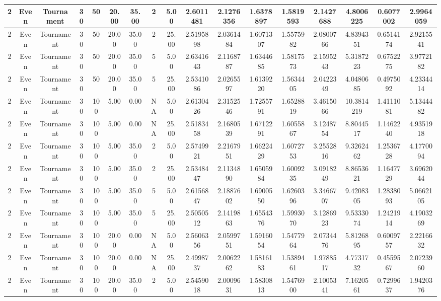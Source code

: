 \documentclass[a4paper]{article}
\begin{document}
\begin{center}
\begin{tabular}{ | c | c | c | c | c | c | c | c | c | c | c | c | c | c | c | c | c | }
		\hline
		2	&	Even	&	Tournament	&	30	&	50	&	20.00	&	35.00	&	2	&	5.00	&	2.6011481	&	2.1276356	&	1.6378897	&	1.5819593	&	2.1427688	&	4.8006225	&	0.6077002	&	2.9964059 \\
		\hline
		2	&	Even	&	Tournament	&	30	&	50	&	20.00	&	35.00	&	2	&	25.00	&	2.5195898	&	2.0361484	&	1.6071307	&	1.5575982	&	2.0800766	&	4.8394351	&	0.6514174	&	2.9215541 \\
		\hline
		2	&	Even	&	Tournament	&	30	&	50	&	20.00	&	35.00	&	5	&	5.00	&	2.6341643	&	2.1168787	&	1.6344685	&	1.5817573	&	2.1595243	&	5.3187223	&	0.6752275	&	3.9772182 \\
		\hline
		2	&	Even	&	Tournament	&	30	&	50	&	20.00	&	35.00	&	5	&	25.00	&	2.5341086	&	2.0265597	&	1.6139220	&	1.5634405	&	2.0422349	&	4.0480685	&	0.4975092	&	4.2334414 \\
		\hline
		2	&	Even	&	Tournament	&	30	&	100	&	5.00	&	0.00	&	NA	&	5.00	&	2.6130426	&	2.3152546	&	1.7255791	&	1.6528819	&	3.4615066	&	10.3814219	&	1.4111081	&	5.1344482 \\
		\hline
		2	&	Even	&	Tournament	&	30	&	100	&	5.00	&	0.00	&	NA	&	25.00	&	2.5183458	&	2.1680539	&	1.6712291	&	1.6055867	&	3.1248754	&	8.8044517	&	1.1462240	&	4.9351918 \\
		\hline
		2	&	Even	&	Tournament	&	30	&	100	&	5.00	&	35.00	&	2	&	5.00	&	2.5749921	&	2.2167951	&	1.6622429	&	1.6072753	&	3.2552816	&	9.3262462	&	1.2536728	&	4.1770094 \\
		\hline
		2	&	Even	&	Tournament	&	30	&	100	&	5.00	&	35.00	&	2	&	25.00	&	2.5348447	&	2.1134890	&	1.6505984	&	1.6009235	&	3.0918249	&	8.8653621	&	1.1647729	&	3.6962044 \\
		\hline
		2	&	Even	&	Tournament	&	30	&	100	&	5.00	&	35.00	&	5	&	5.00	&	2.6156847	&	2.1887602	&	1.6900550	&	1.6260396	&	3.3466707	&	9.4208305	&	1.2838093	&	5.0662105 \\
		\hline
		2	&	Even	&	Tournament	&	30	&	100	&	5.00	&	35.00	&	5	&	25.00	&	2.5050512	&	2.1419863	&	1.6554376	&	1.5993070	&	3.1286923	&	9.5333074	&	1.2421914	&	4.1903269 \\
		\hline
		2	&	Even	&	Tournament	&	30	&	100	&	20.00	&	0.00	&	NA	&	5.00	&	2.5606356	&	2.0599751	&	1.5916054	&	1.5477964	&	2.0734476	&	5.8126895	&	0.6009757	&	2.2216632 \\
		\hline
		2	&	Even	&	Tournament	&	30	&	100	&	20.00	&	0.00	&	NA	&	25.00	&	2.4998737	&	2.0062262	&	1.5816183	&	1.5389461	&	1.9788517	&	4.7731732	&	0.4559567	&	2.0723960 \\
		\hline
		2	&	Even	&	Tournament	&	30	&	100	&	20.00	&	35.00	&	2	&	5.00	&	2.5459018	&	2.0009631	&	1.5830813	&	1.5476900	&	2.1005341	&	7.1620561	&	0.7299637	&	1.9420376 \\

\end{tabular}
\end{center}
\end{document}
